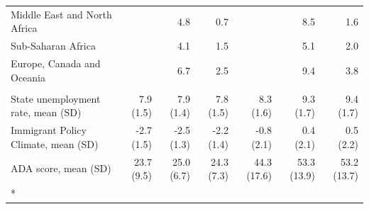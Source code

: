\begin{landscape}
\begin{ThreePartTable}
\begin{longtable}[t]{lrrrrrr}
\hspace{1em}\hspace{1em}Middle East and North Africa &  & 4.8 & 0.7 &  & 8.5 & 1.6\\
\hspace{1em}\hspace{1em}Sub-Saharan Africa &  & 4.1 & 1.5 &  & 5.1 & 2.0\\
\hspace{1em}\hspace{1em}Europe, Canada and Oceania &  & 6.7 & 2.5 &  & 9.4 & 3.8\\
\addlinespace[0.3em]
\multicolumn{7}{l}{\textbf{State context}}\\
\hspace{1em}State unemployment rate, mean (SD) & 7.9 (1.5) & 7.9 (1.4) & 7.8 (1.5) & 8.3 (1.6) & 9.3 (1.7) & 9.4 (1.7)\\
\hspace{1em}Immigrant Policy Climate, mean (SD) & -2.7 (1.5) & -2.5 (1.3) & -2.2 (1.4) & -0.8 (2.1) & 0.4 (2.1) & 0.5 (2.2)\\
\hspace{1em}ADA score, mean (SD) & 23.7 (9.5) & 25.0 (6.7) & 24.3 (7.3) & 44.3 (17.6) & 53.3 (13.9) & 53.2 (13.7)\\*
\end{longtable}
\end{ThreePartTable}
\endgroup
\end{landscape}
